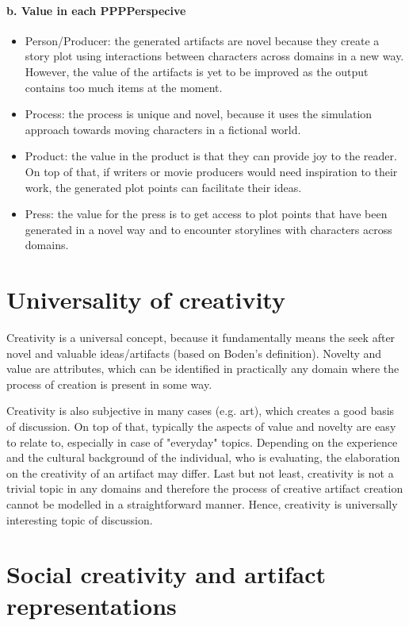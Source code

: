 \documentclass[english]{tktltiki}
\begin{document}
    \paragraph{b. Value in each PPPPerspecive}
    \begin{itemize}
        \item Person/Producer: the generated artifacts are novel because they create a story plot using interactions between characters across domains in a new way. However, the value of the artifacts is yet to be improved as the output contains too much items at the moment.  
        \item Process: the process is unique and novel, because it uses the simulation approach towards moving characters in a fictional world. 
        \item Product: the value in the product is that they can provide joy to the reader. On top of that, if writers or movie producers would need inspiration to their work, the generated plot points can facilitate their ideas. 
        \item Press: the value for the press is to get access to plot points that have been generated in a novel way and to encounter storylines with characters across domains.
    \end{itemize}
    
    \pagebreak
    \section{Universality of creativity}
    Creativity is a universal concept, because it fundamentally means the seek after novel and valuable ideas/artifacts (based on Boden's definition). Novelty and value are attributes, which can be identified in practically any domain where the process of creation is present in some way. 
    
    Creativity is also subjective in many cases (e.g. art), which creates a good basis of discussion. On top of that, typically the aspects of value and novelty are easy to relate to, especially in case of "everyday" topics. Depending on the experience and the cultural background of the individual, who is evaluating, the elaboration on the creativity of an artifact may differ. Last but not least, creativity is not a trivial topic in any domains and therefore the process of creative artifact creation cannot be modelled in a straightforward manner. Hence, creativity is universally interesting topic of discussion.
    
    \section{Social creativity and artifact representations}
    
\end{document}
